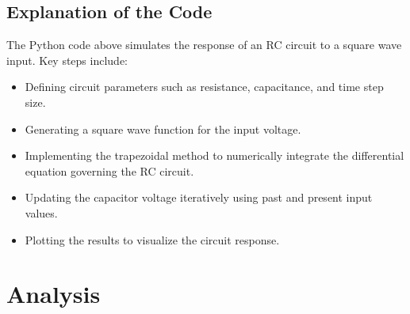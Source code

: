 \documentclass[12pt]{article}
\begin{document}
\subsection{Explanation of the Code}
The Python code above simulates the response of an RC circuit to a square wave input. Key steps include:
\begin{itemize}
    \item Defining circuit parameters such as resistance, capacitance, and time step size.
    \item Generating a square wave function for the input voltage.
    \item Implementing the trapezoidal method to numerically integrate the differential equation governing the RC circuit.
    \item Updating the capacitor voltage iteratively using past and present input values.
    \item Plotting the results to visualize the circuit response.
\end{itemize}
\section{Analysis}
\end{document}
